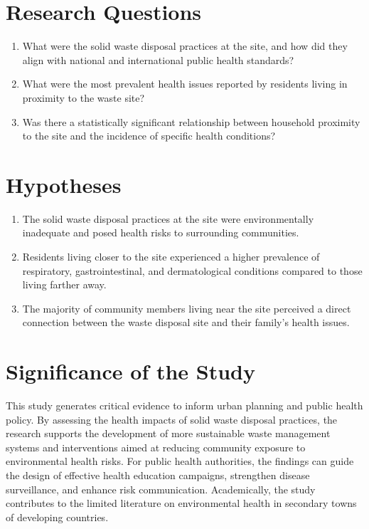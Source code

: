 \section{Research Questions}
\begin{enumerate}[label=\arabic*.]
    \item What were the solid waste disposal practices at the site, and how did they align with national and international public health standards?
    \item What were the most prevalent health issues reported by residents living in proximity to the waste site?
    \item Was there a statistically significant relationship between household proximity to the site and the incidence of specific health conditions?
\end{enumerate}

\section{Hypotheses}
\begin{enumerate}[label=H\arabic*.]
    \item The solid waste disposal practices at the site were environmentally inadequate and posed health risks to surrounding communities.
    \item Residents living closer to the site experienced a higher prevalence of respiratory, gastrointestinal, and dermatological conditions compared to those living farther away.
    \item The majority of community members living near the site perceived a direct connection between the waste disposal site and their family’s health issues.
\end{enumerate}

\section{Significance of the Study}
This study generates critical evidence to inform urban planning and public health policy. By assessing the health impacts of solid waste disposal practices, the research supports the development of more sustainable waste management systems and interventions aimed at reducing community exposure to environmental health risks. For public health authorities, the findings can guide the design of effective health education campaigns, strengthen disease surveillance, and enhance risk communication. Academically, the study contributes to the limited literature on environmental health in secondary towns of developing countries.

